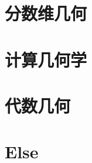 \documentclass[UTF8]{../09-Mathematics}
\begin{document}
\chapter{分数维几何}
\chapter{计算几何学}
\chapter{代数几何}



\chapter{Else}
\end{document}

